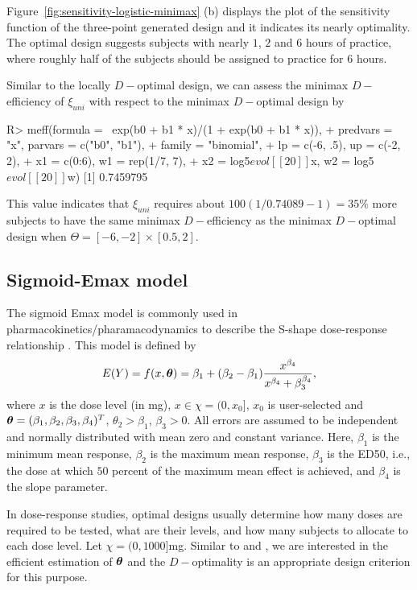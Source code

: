Figure~\ref{fig:sensitivity-logistic-minimax} (b) displays the plot of the sensitivity function of the three-point generated design and it  indicates its nearly optimality.  
The optimal design  suggests subjects with nearly $1$, $2$ and $6$ hours of practice, where roughly half of the subjects should be  assigned to practice for $6$ hours.


Similar to the locally $D-$optimal design, we can assess the minimax $D-$efficiency of $\xi_{uni}$ with respect to the minimax $D-$optimal design by
\begin{example}
R> meff(formula = ~exp(b0 + b1 * x)/(1 + exp(b0 + b1 * x)),
+      predvars = "x", parvars = c("b0", "b1"),
+      family = "binomial",
+      lp = c(-6, .5), up = c(-2, 2),
+      x1 = c(0:6), w1 = rep(1/7, 7),
+      x2 = log5$evol[[20]]$x, w2 = log5$evol[[20]]$w)
[1] 0.7459795
\end{example}
This value indicates that  $\xi_{uni}$ requires about $100(1/0.74089-1) = 35\%$ more subjects to have the same minimax $D-$efficiency  as the minimax $D-$optimal design  when $\Theta = [-6, -2]\times[0.5, 2]$.


\subsection{Sigmoid-Emax model}
\label{sec:sigmoid}
The sigmoid Emax model is commonly used in pharmacokinetics/pharamacodynamics to describe the S-shape dose-response relationship \citep[see, e.g.,][]{ Macdougall2006, Thomas2006}.
This model  is defined by
\begin{equation}
\label{eq:sigmoid-Emax}
E(Y) = f(x, \boldsymbol{\theta}) = \beta_1 + (\beta_2-\beta_1) \frac{x^{\beta_4}}{x^{\beta_4} + \beta_3^{\beta_4}},
\end{equation}
where $x$ is the dose level (in mg), $x \in \chi = (0, x_0]$, $x_0$ is user-selected and  $\boldsymbol{\theta} = (\beta_1, \beta_2, \beta_3, \beta_4)^T$, $\theta_2>\beta_1$,  $\beta_3>0$.
All  errors  are assumed to be independent and normally distributed with mean zero and constant variance. Here, $\beta_1$ is the minimum mean response, $\beta_2$ is the maximum mean response, $\beta_3$ is the ED50, i.e., the dose at which $50$ percent of the maximum mean effect is achieved, and $\beta_4$ is the slope parameter.



In dose-response studies, optimal designs  usually  determine how many doses are required to be tested, what are their levels, and how many subjects to allocate to each dose level.
Let  $\chi = (0, 1000]$mg.
Similar to \citet{dragalin2007adaptive} and \citet{wang2014adaptive}, we are interested in the efficient estimation of $\boldsymbol{\theta}$ and the $D-$optimality  is an appropriate design criterion for this purpose.

